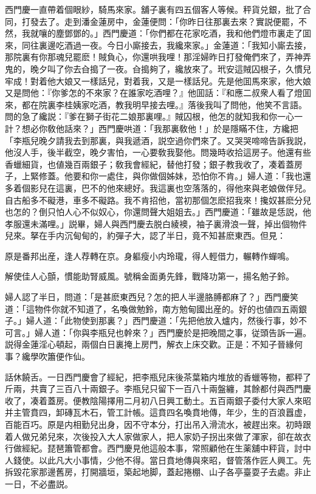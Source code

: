 西門慶一直帶着個眼紗，騎馬來家。舖子裏有四五個客人等候。秤貨兑銀，批了合同，打發去了。走到潘金蓮房中，金蓮便問：「你昨日往那裏去來？實説便罷，不然，我就嚷的塵鄧鄧的。」西門慶道：「你們都在花家吃酒，我和他們燈巿裏走了囬來，同往裏邊吃酒過一夜。今日小廝接去，我纔來家。」金蓮道：「我知小廝去接，那院裏有你那魂兒罷麽！賊負心，你還哄我哩！那淫婦昨日打發俺們來了，弄神弄鬼的，晚夕叫了你去㒲搗了一夜。㒲搗夠了，纔放來了。玳安這賊囚根子，久慣兒牢成！對着他大娘又一樣話兒，對着我，又是一樣話兒。先是他囬馬來家，他大娘又是問他：『你爹怎的不來家？在誰家吃酒哩？』他囬話：『和應二叔衆人看了燈囬來，都在院裏李桂姨家吃酒，教我明早接去哩。』落後我叫了問他，他笑不言語。問的急了纔説：『爹在獅子街花二娘那裏哩。』賊囚根，他怎的就知我和你一心一計？想必你敎他話來？」西門慶哄道：「我那裏敎他！」於是隱瞞不住，方纔把「李瓶兒晚夕請我去到那裏，與我遞酒，説空過你們來了。又哭哭啼啼告訴我説，他沒人手，後半截空，晚夕害怕，一心要敎我娶他。問幾時收拾這房子。他還有些香蠟細貨，也値幾百兩銀子；敎我會經紀，替他打發；銀子教我收了，凑着蓋房子，上緊修蓋。他要和你一處住，與你做個姊妹，恐怕你不肯。」婦人道：「我也還多着個影兒在這裏，巴不的他來總好。我這裏也空落落的，得他來與老娘做伴兒。自古船多不礙港，車多不礙路。我不肯招他，當初那個怎麽招我來！攙奴甚麽分兒也怎的？倒只怕人心不似奴心，你還問聲大姐姐去。」西門慶道：「雖故是恁説，他孝服還未滿哩。」説畢，婦人與西門慶去脱白綾襖，袖子裏滑浪一聲，掉出個物件兒來。拏在手内沉甸甸的，約彈子大，認了半日，竟不知甚麽東西。但見：

\begin{myquote}
原是番邦出産，逢人荐轉在京。身軀瘦小内玲瓏，得人輕借力，輾轉作蟬鳴。

解使佳人心顫，慣能助腎威風。號稱金面勇先鋒，戰降功第一，揚名勉子鈴。
\end{myquote}

婦人認了半日，問道：「是甚麽東西兒？怎的把人半邊胳膊都麻了？」西門慶笑道：「這物件你就不知道了，名喚做勉鈴，南方勉甸國出産的。好的也値四五兩銀子。」婦人道：「此物使到那裏？」西門慶道：「先把他放入爐内，然後行事，妙不可言。」婦人道：「你與李瓶兒也幹來？」西門慶於是把晚間之事，従頭告訴一遍。説得金蓮淫心頓起，兩個白日裏掩上房門，解衣上床交歡。正是：不知子晉緣何事？纔學吹簫便作仙。

話休饒舌。一日西門慶會了經紀，把李瓶兒床後茶葉箱内堆放的香蠟等物，都秤了斤兩，共賣了三百八十兩銀子。李瓶兒只留下一百八十兩盤纏，其餘都付與西門慶收了，凑着蓋房。便教陰陽擇用二月初八日興工動土。五百兩銀子委付大家人來昭并主管賁四，卸磚瓦木石，管工計帳。這賁四名喚賁地傳，年少，生的百浪囂虚，百能百巧。原是内相勤兒出身，因不守本分，打出吊入滑流水，被趕出來。初時跟着人做兄弟兒來，次後投入大人家做家人，把人家奶子拐出來做了渾家，卻在故衣行做經紀。琵琶簫管都會。西門慶見他這般本事，常照顧他在生薬舖中秤貨，討中人錢使。以此凡大小事情，少他不得。當日賁地傳與來昭，督管落作匠人興工。先拆毀花家那邊舊房，打開牆垣，築起地脚，蓋起捲棚、山子各亭臺耍子去處。非止一日，不必盡説。

